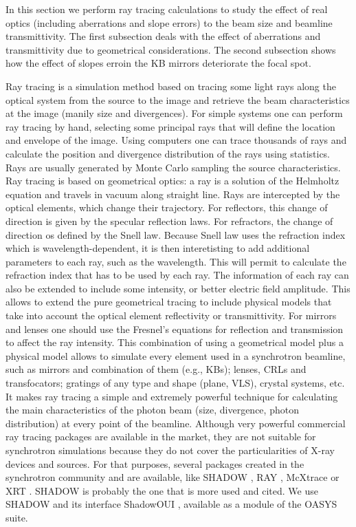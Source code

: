 \documentclass{iucr}              %
\begin{document}
In this section we perform ray tracing calculations to study the effect of real optics (including aberrations and slope errors) to the beam size and beamline transmittivity. The first subsection deals with the effect of aberrations and transmittivity due to geometrical considerations. The second subsection shows how the effect of slopes erroin the KB mirrors deteriorate the focal spot.  

Ray tracing is a simulation method based on tracing some light rays along the optical system from the source to the image and retrieve the beam characteristics at the image (manily size and divergences). For simple systems one can perform ray tracing by hand, selecting some principal rays that will define the location and envelope of the image. Using computers one can trace thousands of rays and calculate the position and divergence distribution of the rays using statistics. Rays are usually generated by Monte Carlo sampling the source characteristics. Ray tracing is based on geometrical optics: a ray is a solution of the Helmholtz equation and travels in vacuum along straight line. Rays are intercepted by the optical elements, which change their trajectory. For reflectors, this change of direction is given by the specular reflection laws. For refractors, the change of direction os defined by the Snell law. Because Snell law uses the refraction index which is wavelength-dependent, it is then interetisting to add additional parameters to each ray, such as the wavelength. This will permit to calculate the refraction index that has to be used by each ray. The information of each ray can also be extended to include some intensity, or better electric field amplitude. This allows to extend the pure geometrical tracing to include physical models that take into account the optical element reflectivity or transmittivity. For mirrors and lenses one should use the Fresnel's equations for reflection and transmission to affect the ray intensity. This combination of using a geometrical model plus a physical model allows to simulate every element used in a synchrotron beamline, such as mirrors and combination of them (e.g., KBs); lenses, CRLs and transfocators; gratings of any type and shape (plane, VLS), crystal systems, etc. It makes ray tracing a simple and extremely powerful technique for calculating the main characteristics of the photon beam (size, divergence, photon distribution) at every point of the beamline. Although very powerful commercial ray tracing packages are available in the market, they are not suitable for synchrotron simulations because they do not cover the particularities of X-ray devices and sources. For that purposes, several packages created in the synchrotron community and are available, like SHADOW \cite{codeSHADOW}, RAY \cite{codeRAY}, McXtrace \cite{codeMCXTRACE} or XRT \cite{codeXRT}. SHADOW is probably the one that is more used and cited. We use SHADOW and its interface ShadowOUI \cite{codeSHADOWOUI}, available as a module of the OASYS suite.
\end{document}
